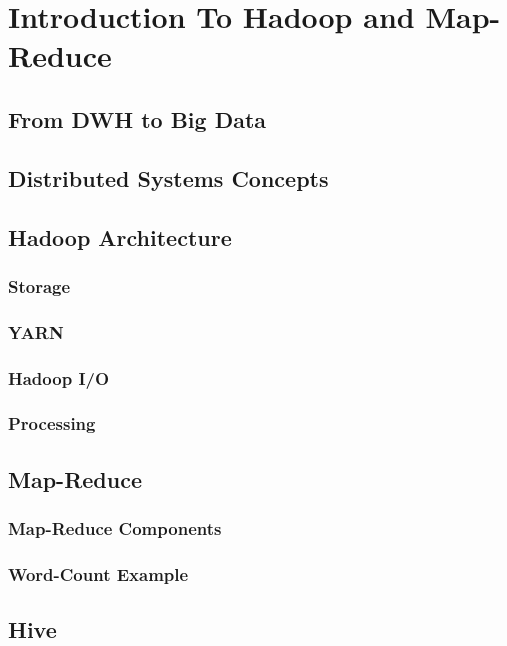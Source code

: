 \section{Introduction To Hadoop and Map-Reduce}
\subsection{From DWH to Big Data}
\subsection{Distributed Systems Concepts}
\subsection{Hadoop Architecture}
\subsubsection{Storage}
\subsubsection{YARN}
\subsubsection{Hadoop I/O}
\subsubsection{Processing}
\subsection{Map-Reduce}
\subsubsection{Map-Reduce Components}
\subsubsection{Word-Count Example}
\subsection{Hive}
